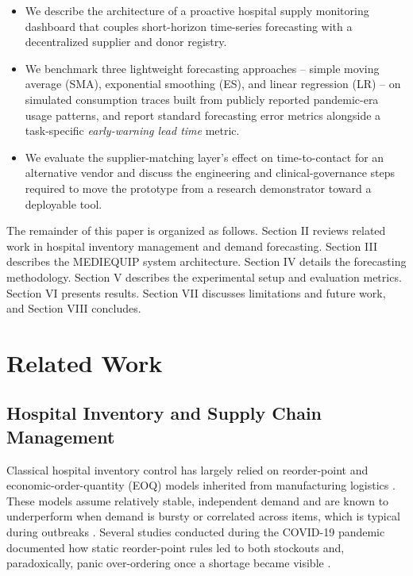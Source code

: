 \documentclass[conference]{IEEEtran}
\begin{document}
\begin{itemize}
\item We describe the architecture of a proactive hospital supply monitoring dashboard that couples short-horizon time-series forecasting with a decentralized supplier and donor registry.
\item We benchmark three lightweight forecasting approaches -- simple moving average (SMA), exponential smoothing (ES), and linear regression (LR) -- on simulated consumption traces built from publicly reported pandemic-era usage patterns, and report standard forecasting error metrics alongside a task-specific \emph{early-warning lead time} metric.
\item We evaluate the supplier-matching layer's effect on time-to-contact for an alternative vendor and discuss the engineering and clinical-governance steps required to move the prototype from a research demonstrator toward a deployable tool.
\end{itemize}

The remainder of this paper is organized as follows. Section II reviews related work in hospital inventory management and demand forecasting. Section III describes the MEDIEQUIP system architecture. Section IV details the forecasting methodology. Section V describes the experimental setup and evaluation metrics. Section VI presents results. Section VII discusses limitations and future work, and Section VIII concludes.


\section{Related Work}

\subsection{Hospital Inventory and Supply Chain Management}

Classical hospital inventory control has largely relied on reorder-point and economic-order-quantity (EOQ) models inherited from manufacturing logistics \cite{b4}. These models assume relatively stable, independent demand and are known to underperform when demand is bursty or correlated across items, which is typical during outbreaks \cite{b1}. Several studies conducted during the COVID-19 pandemic documented how static reorder-point rules led to both stockouts and, paradoxically, panic over-ordering once a shortage became visible \cite{b2,b5}.
\end{document}
